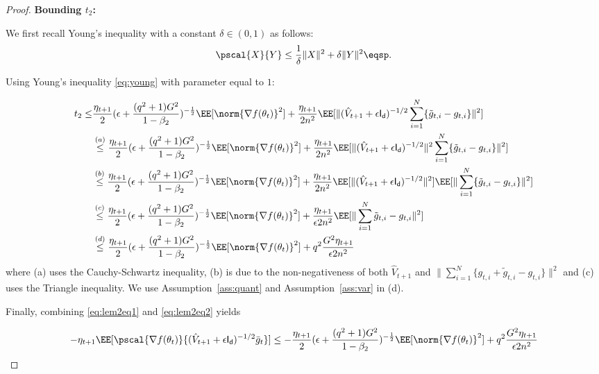 \documentclass[11pt]{article}
\begin{document}
\begin{proof}
\textbf{Bounding $t_2$:}

We first recall Young's inequality with a constant $\delta \in (0,1)$ as follows:
\begin{equation}\label{eq:young}
\pscal{X}{Y} \leq \frac{1}{\delta} \|X\|^2 + \delta \|Y\|^2 \eqsp.
\end{equation}

Using Young's inequality \eqref{eq:young} with parameter equal to $1$:

\begin{equation}\label{eq:lem2eq2}
\begin{split}
t_2 \leq &  \frac{\eta_{t+1}}{2} (\epsilon + \frac{(q^2+1)G^2}{1 - \beta_2})^{-\frac{1}{2}} \EE[\norm{\nabla f(\theta_t)}^2] +\frac{\eta_{t+1}}{2n^2} \EE[\|(\hat{V}_{t+1} + \epsilon \mathsf{I_d})^{-1/2} \sum_{i=1}^N  \{ \tilde g_{t,i} - g_{t,i} \} \|^2]\\
& \overset{(a)}{\leq} \frac{\eta_{t+1}}{2} (\epsilon + \frac{(q^2+1)G^2}{1 - \beta_2})^{-\frac{1}{2}} \EE[\norm{\nabla f(\theta_t)}^2] +\frac{\eta_{t+1}}{2n^2} \EE[\|(\hat{V}_{t+1} + \epsilon \mathsf{I_d})^{-1/2} \|^2 \sum_{i=1}^N  \{\tilde g_{t,i} - g_{t,i} \} \|^2]\\
& \overset{(b)}{\leq} \frac{\eta_{t+1}}{2} (\epsilon + \frac{(q^2+1)G^2}{1 - \beta_2})^{-\frac{1}{2}} \EE[\norm{\nabla f(\theta_t)}^2] +\frac{\eta_{t+1}}{2n^2} \EE[\|(\hat{V}_{t+1} + \epsilon \mathsf{I_d})^{-1/2} \|^2] \EE[\| \sum_{i=1}^N  \{\tilde g_{t,i} - g_{t,i} \} \|^2]\\
& \overset{(c)}{\leq} \frac{\eta_{t+1}}{2} (\epsilon + \frac{(q^2+1)G^2}{1 - \beta_2})^{-\frac{1}{2}} \EE[\norm{\nabla f(\theta_t)}^2] +\frac{\eta_{t+1}}{\epsilon 2n^2}  \EE[\| \sum_{i=1}^N \tilde g_{t,i} - g_{t,i} \|^2]\\
& \overset{(d)}{\leq} \frac{\eta_{t+1}}{2}(\epsilon + \frac{(q^2+1)G^2}{1 - \beta_2})^{-\frac{1}{2}} \EE[\norm{\nabla f(\theta_t)}^2] +q^2\frac{G^2 \eta_{t+1}}{\epsilon 2n^2}
\end{split}
\end{equation}
where (a) uses the Cauchy-Schwartz inequality, (b) is due to the non-negativeness of both $\hat{V}_{t+1}$ and $\| \sum_{i=1}^N  \{g_{t,i} + \tilde g_{t,i} - g_{t,i} \} \|^2$ and (c) uses the Triangle inequality.
We use Assumption~\ref{ass:quant} and Assumption~\ref{ass:var} in (d).

Finally, combining \eqref{eq:lem2eq1} and \eqref{eq:lem2eq2} yields

\begin{equation}
-\eta_{t+1}\EE[\pscal{\nabla f(\theta_t)}{(\hat{V}_{t+1} + \epsilon \mathsf{I_d})^{-1/2} \bar{g}_t}] \leq - \frac{\eta_{t+1}}{2}  (\epsilon + \frac{(q^2+1)G^2}{1 - \beta_2})^{-\frac{1}{2}} \EE[\norm{\nabla f(\theta_t)}^2] +q^2 \frac{G^2 \eta_{t+1}}{\epsilon 2n^2}
\end{equation}


\end{proof}
\end{document}
